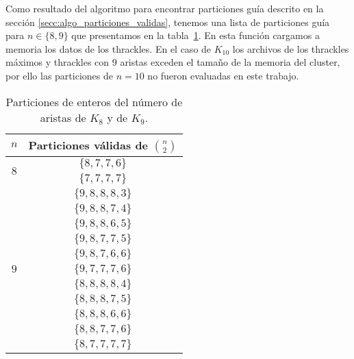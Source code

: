   Como resultado del algoritmo para encontrar particiones guía descrito en la sección
  \ref{secc:algo_particiones_validas}, tenemos una lista de particiones guía para
  $n\in\{8,9\}$ que presentamos en la tabla~\ref{tabla:particionesk8k9_2}. En esta función cargamos a memoria los datos de los thrackles. En el caso de $K_{10}$ los archivos de los
  thrackles máximos y thrackles con 9 aristas exceden el tamaño de la memoria del cluster, por ello
  las particiones de $n=10$ no fueron evaluadas en este trabajo.
  \begin{table}[t]
    \centering
    \begin{tabular}{|c|c|}
      \hline
      $n$                       & Particiones válidas de $\displaystyle\binom{n}{2}$ \\ \hline\hline
      \multirow{2}{*}{$ 8 $}    & $\{8,7,7,6\}$ \\ \cline{2-2}
                                & $\{7,7,7,7\}$ \\ \hline
      \multirow{11}{*}{$ 9 $}   &$\{9,8,8,8,3\}$ \\ \cline{2-2}
                                &$\{9,8,8,7,4\}$ \\ \cline{2-2}
                                &$\{9,8,8,6,5\}$ \\ \cline{2-2}
                                &$\{9,8,7,7,5\}$ \\ \cline{2-2}
                                &$\{9,8,7,6,6\}$ \\ \cline{2-2}
                                &$\{9,7,7,7,6\}$ \\ \cline{2-2}
                                &$\{8,8,8,8,4\}$ \\ \cline{2-2}
                                &$\{8,8,8,7,5\}$ \\ \cline{2-2}
                                &$\{8,8,8,6,6\}$ \\ \cline{2-2}
                                &$\{8,8,7,7,6\}$ \\ \cline{2-2}
                                &$\{8,7,7,7,7\}$ \\ \hline
    \end{tabular}
    \caption{Particiones de enteros del número de aristas de $K_8$ y de $K_9$. }
    \label{tabla:particionesk8k9_2}
  \end{table}

